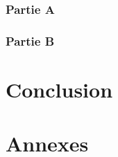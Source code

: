 \documentclass{article}
\begin{document}
\section{Partie A}

\newpage
\section{Partie B}

\newpage
\part{Conclusion}


\newpage

\appendix

\part{Annexes}

\listoffigures
\end{document}
